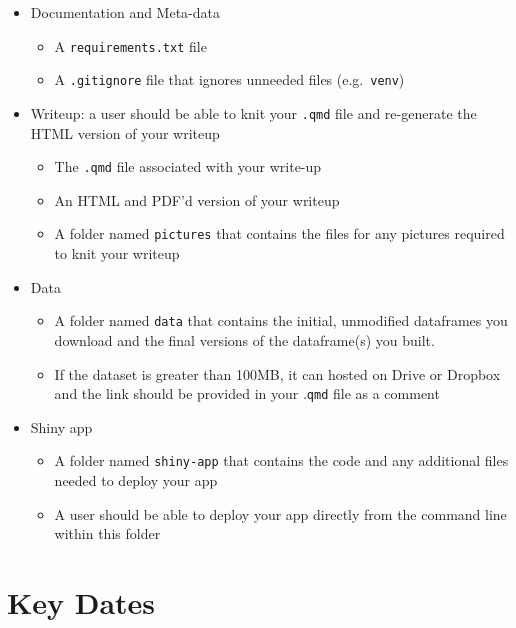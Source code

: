 \documentclass[
  letterpaper,
  DIV=11,
  numbers=noendperiod]{scrartcl}
\providecommand{\tightlist}{%
  \setlength{\itemsep}{0pt}\setlength{\parskip}{0pt}}\usepackage{longtable,booktabs,array}
\begin{document}
\begin{itemize}
\tightlist
\item
  Documentation and Meta-data

  \begin{itemize}
  \tightlist
  \item
    A \texttt{requirements.txt} file
  \item
    A \texttt{.gitignore} file that ignores unneeded files
    (e.g.~\texttt{venv})
  \end{itemize}
\item
  Writeup: a user should be able to knit your \texttt{.qmd} file and
  re-generate the HTML version of your writeup

  \begin{itemize}
  \tightlist
  \item
    The \texttt{.qmd} file associated with your write-up
  \item
    An HTML and PDF'd version of your writeup
  \item
    A folder named \texttt{pictures} that contains the files for any
    pictures required to knit your writeup
  \end{itemize}
\item
  Data

  \begin{itemize}
  \tightlist
  \item
    A folder named \texttt{data} that contains the initial, unmodified
    dataframes you download and the final versions of the dataframe(s)
    you built.
  \item
    If the dataset is greater than 100MB, it can hosted on Drive or
    Dropbox and the link should be provided in your .\texttt{qmd} file
    as a comment
  \end{itemize}
\item
  Shiny app

  \begin{itemize}
  \tightlist
  \item
    A folder named \texttt{shiny-app} that contains the code and any
    additional files needed to deploy your app
  \item
    A user should be able to deploy your app directly from the command
    line within this folder
  \end{itemize}
\end{itemize}

\section{Key Dates}\label{key-dates}
\end{document}
